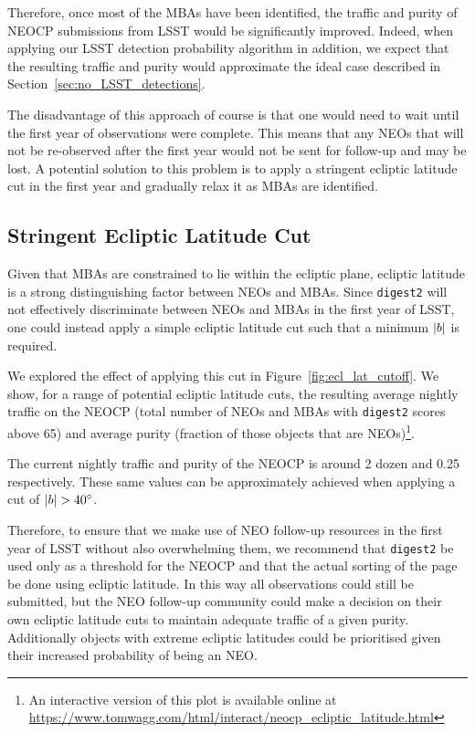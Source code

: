 \documentclass[twocolumn]{aastex631}
\newcommand{\dig}{\texttt{digest2}}
\begin{document}
Therefore, once most of the MBAs have been identified, the traffic and purity of NEOCP submissions from LSST would be significantly improved. Indeed, when applying our LSST detection probability algorithm in addition, we expect that the resulting traffic and purity would approximate the ideal case described in Section~\ref{sec:no_LSST_detections}.

The disadvantage of this approach of course is that one would need to wait until the first year of observations were complete. This means that any NEOs that will not be re-observed after the first year would not be sent for follow-up and may be lost. A potential solution to this problem is to apply a stringent ecliptic latitude cut in the first year and gradually relax it as MBAs are identified.

\subsection{Stringent Ecliptic Latitude Cut}\label{sec:ecl_lat}
Given that MBAs are constrained to lie within the ecliptic plane, ecliptic latitude is a strong distinguishing factor between NEOs and MBAs. Since \dig{} will not effectively discriminate between NEOs and MBAs in the first year of LSST, one could instead apply a simple ecliptic latitude cut such that a minimum $\abs{b}$ is required.

We explored the effect of applying this cut in Figure~\ref{fig:ecl_lat_cutoff}. We show, for a range of potential ecliptic latitude cuts, the resulting average nightly traffic on the NEOCP (total number of NEOs and MBAs with \dig{} scores above 65) and average purity (fraction of those objects that are NEOs)\footnote{An interactive version of this plot is available online at \url{https://www.tomwagg.com/html/interact/neocp_ecliptic_latitude.html}}.

The current nightly traffic and purity of the NEOCP is around 2 dozen and 0.25 respectively. These same values can be approximately achieved when applying a cut of $\abs{b} > 40^\circ$.

Therefore, to ensure that we make use of NEO follow-up resources in the first year of LSST without also overwhelming them, we recommend that \dig{} be used only as a threshold for the NEOCP and that the actual sorting of the page be done using ecliptic latitude. In this way all observations could still be submitted, but the NEO follow-up community could make a decision on their own ecliptic latitude cuts to maintain adequate traffic of a given purity. Additionally objects with extreme ecliptic latitudes could be prioritised given their increased probability of being an NEO.
\end{document}

